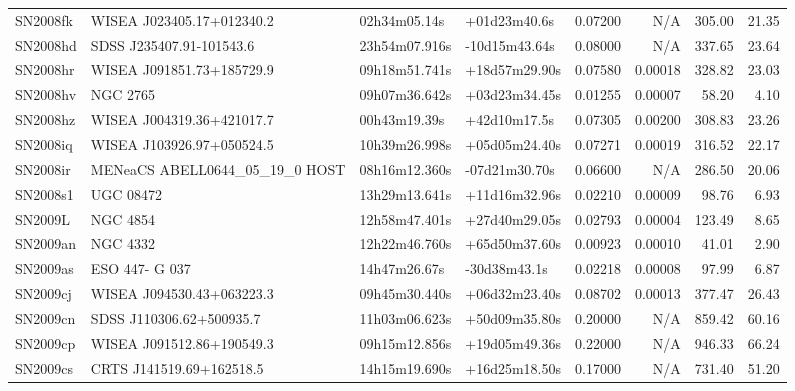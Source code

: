 \begin{longtable}{llllrrrr}
SN2008fk         &       WISEA J023405.17+012340.2 &    02h34m05.14s &    +01d23m40.6s &  0.07200 &      N/A &   305.00 &       21.35 \\
SN2008hd         &        SDSS J235407.91-101543.6 &   23h54m07.916s &   -10d15m43.64s &  0.08000 &      N/A &   337.65 &       23.64 \\
SN2008hr         &       WISEA J091851.73+185729.9 &   09h18m51.741s &   +18d57m29.90s &  0.07580 &  0.00018 &   328.82 &       23.03 \\
SN2008hv         &                        NGC 2765 &   09h07m36.642s &   +03d23m34.45s &  0.01255 &  0.00007 &    58.20 &        4.10 \\
SN2008hz         &       WISEA J004319.36+421017.7 &    00h43m19.39s &    +42d10m17.5s &  0.07305 &  0.00200 &   308.83 &       23.26 \\
SN2008iq         &       WISEA J103926.97+050524.5 &   10h39m26.998s &   +05d05m24.40s &  0.07271 &  0.00019 &   316.52 &       22.17 \\
SN2008ir         &  MENeaCS ABELL0644_05_19_0 HOST &   08h16m12.360s &   -07d21m30.70s &  0.06600 &      N/A &   286.50 &       20.06 \\
SN2008s1         &                       UGC 08472 &   13h29m13.641s &   +11d16m32.96s &  0.02210 &  0.00009 &    98.76 &        6.93 \\
SN2009L          &                        NGC 4854 &   12h58m47.401s &   +27d40m29.05s &  0.02793 &  0.00004 &   123.49 &        8.65 \\
SN2009an         &                        NGC 4332 &   12h22m46.760s &   +65d50m37.60s &  0.00923 &  0.00010 &    41.01 &        2.90 \\
SN2009as         &                  ESO 447- G 037 &    14h47m26.67s &    -30d38m43.1s &  0.02218 &  0.00008 &    97.99 &        6.87 \\
SN2009cj         &       WISEA J094530.43+063223.3 &   09h45m30.440s &   +06d32m23.40s &  0.08702 &  0.00013 &   377.47 &       26.43 \\
SN2009cn         &        SDSS J110306.62+500935.7 &   11h03m06.623s &   +50d09m35.80s &  0.20000 &      N/A &   859.42 &       60.16 \\
SN2009cp         &       WISEA J091512.86+190549.3 &   09h15m12.856s &   +19d05m49.36s &  0.22000 &      N/A &   946.33 &       66.24 \\
SN2009cs         &        CRTS J141519.69+162518.5 &   14h15m19.690s &   +16d25m18.50s &  0.17000 &      N/A &   731.40 &       51.20 \\

\end{longtable}
